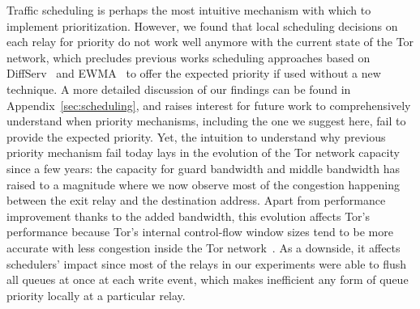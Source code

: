 Traffic scheduling is
perhaps the most intuitive mechanism with which to implement
prioritization. However, we found that local scheduling decisions on each relay for 
priority do not work well anymore with the current state of the Tor network, which 
precludes previous works scheduling approaches based on 
DiffServ~\cite{dovrolis1999case} and EWMA~\cite{tang2010improved} to offer the 
expected priority if used without a new technique. A more detailed
discussion of our findings can be found in Appendix~\ref{sec:scheduling}, and raises 
interest for future work to comprehensively understand when priority mechanisms, 
including the one we suggest here, fail to provide the expected priority. Yet, the 
intuition to understand why previous priority mechanism fail today lays in the 
evolution of the Tor network capacity since a few years: the capacity for guard 
bandwidth and middle bandwidth has raised to a magnitude where we now observe most 
of the congestion happening between the exit relay and the destination address. 
Apart from performance improvement thanks to the added bandwidth, this evolution 
affects Tor's performance because Tor's internal control-flow window sizes tend to 
be more accurate with less congestion inside the Tor network~\cite{archive-2009-mail, kiraly2008solving}. As a downside, it affects schedulers' impact since most of 
the relays in our experiments were able to flush all queues at once at each write 
event, which makes inefficient any form of queue priority locally at a particular 
relay.

